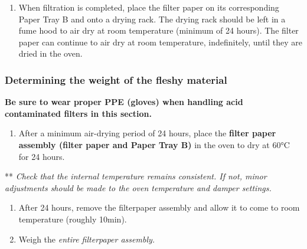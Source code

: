 \documentclass[]{book}
\providecommand{\tightlist}{%
  \setlength{\itemsep}{0pt}\setlength{\parskip}{0pt}}
\begin{document}
\begin{enumerate}
\def\labelenumi{\arabic{enumi}.}
\setcounter{enumi}{3}
\tightlist
\item
  When filtration is completed, place the filter paper on its corresponding Paper Tray B and onto a drying rack. The drying rack should be left in a fume hood to air dry at room temperature (minimum of 24 hours). The filter paper can continue to air dry at room temperature, indefinitely, until they are dried in the oven.
\end{enumerate}

\hypertarget{determining-the-weight-of-the-fleshy-material}{%
\subsubsection{Determining the weight of the fleshy material}\label{determining-the-weight-of-the-fleshy-material}}

\textbf{Be sure to wear proper PPE (gloves) when handling acid contaminated filters in this section.}

\begin{enumerate}
\def\labelenumi{\arabic{enumi}.}
\tightlist
\item
  After a minimum air-drying period of 24 hours, place the \textbf{filter paper assembly (filter paper and Paper Tray B)} in the oven to dry at 60°C for 24 hours.
\end{enumerate}

** \emph{Check that the internal temperature remains consistent. If not, minor adjustments should be made to the oven temperature and damper settings.}

\begin{enumerate}
\def\labelenumi{\arabic{enumi}.}
\setcounter{enumi}{1}
\item
  After 24 hours, remove the filterpaper assembly and allow it to come to room temperature (roughly 10min).
\item
  Weigh the \emph{entire filterpaper assembly.}
\end{enumerate}
\end{document}
